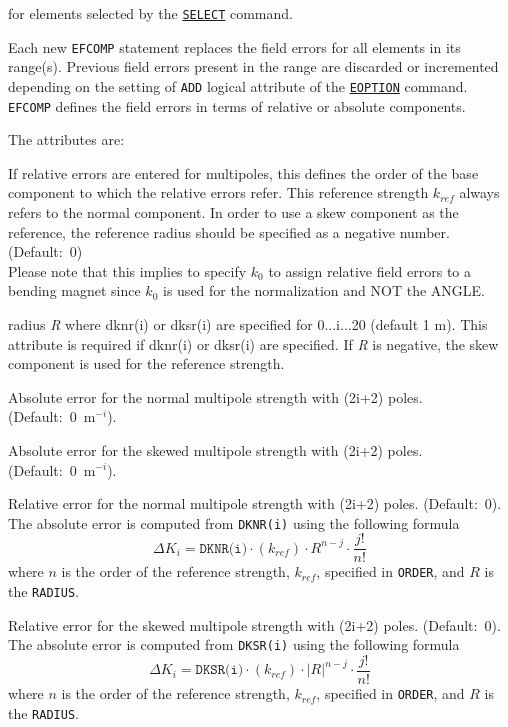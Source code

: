 for elements selected by the
\hyperref[sec:select]{\texttt{SELECT}} command.

Each new \texttt{EFCOMP} statement replaces the field errors for all
elements in its range(s). Previous field errors present in the range are
discarded or incremented depending on the setting of
\texttt{ADD} logical attribute of the
\hyperref[sec:eoption]{\texttt{EOPTION}} command. 
\texttt{EFCOMP} defines the field errors in terms of
relative or absolute components.

The attributes are: 
\begin{madlist}
   If relative errors are entered for multipoles, this defines
  the order of the base component to which the relative  errors
  refer. This reference strength $k_{ref}$ always refers to the
  normal component. In order to use a skew component as the reference, the
  reference radius should be specified as a negative number. (Default:~0)  \\
  Please note that this implies to specify $k_0$ to assign
  relative field errors to a bending magnet since $k_0$ is used
  for the normalization and NOT the ANGLE. 

   radius \textit{R} where dknr(i) or dksr(i) are specified
  for 0...i...20 (default 1 m). This attribute is required if dknr(i) or
  dksr(i) are specified. If \textit{R} is negative, the skew component is
  used for the reference strength.  

   Absolute error for the normal multipole strength with
  (2i+2) poles. (Default:~0~m$^{-i}$).  

   Absolute error for the skewed multipole strength with
  (2i+2) poles. (Default:~0~m$^{-i}$).  

   Relative error for the normal multipole strength with
  (2i+2) poles. (Default:~0). The absolute error is computed from \texttt{DKNR(i)} using the following formula
  $$\Delta K_{i}=\texttt{DKNR(i)}\cdot\left(k_{ref}\right)\cdot R^{n-j}\cdot\frac{j!}{n!}$$
  where $n$ is the order of the reference strength, $k_{ref}$, specified in \texttt{ORDER}, and $R$ is the \texttt{RADIUS}.

   Relative error for the skewed multipole strength with
  (2i+2) poles. (Default:~0). The absolute error is computed from \texttt{DKSR(i)} using the following formula
  $$\Delta K_{i}=\texttt{DKSR(i)}\cdot\left(k_{ref}\right)\cdot |R|^{n-j}\cdot\frac{j!}{n!}$$
  where $n$ is the order of the reference strength, $k_{ref}$, specified in \texttt{ORDER}, and $R$ is the \texttt{RADIUS}. 
\end{madlist}

